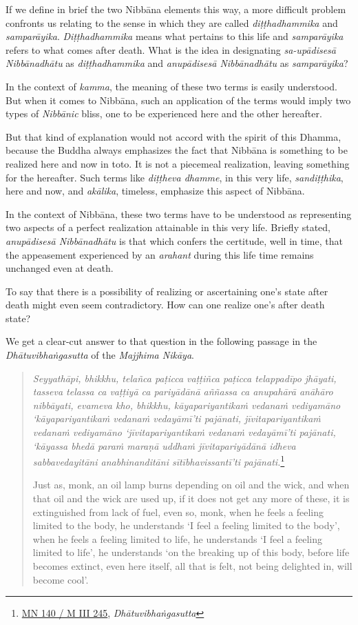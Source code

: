 If we define in brief the two Nibbāna elements this way, a more difficult problem confronts us relating to the sense in which they are called \emph{diṭṭhadhammika} and \emph{samparāyika}. \emph{Diṭṭhadhammika} means what pertains to this life and \emph{samparāyika} refers to what comes after death. What is the idea in designating \emph{sa-upādisesā Nibbānadhātu} as \emph{diṭṭhadhammika} and \emph{anupādisesā Nibbānadhātu} as \emph{samparāyika}?

In the context of \emph{kamma}, the meaning of these two terms is easily understood. But when it comes to Nibbāna, such an application of the terms would imply two types of \emph{Nibbānic} bliss, one to be experienced here and the other hereafter.

But that kind of explanation would not accord with the spirit of this Dhamma, because the Buddha always emphasizes the fact that Nibbāna is something to be realized here and now in toto. It is not a piecemeal realization, leaving something for the hereafter. Such terms like \emph{diṭṭheva dhamme}, in this very life, \emph{sandiṭṭhika}, here and now, and \emph{akālika}, timeless, emphasize this aspect of Nibbāna.

In the context of Nibbāna, these two terms have to be understood as representing two aspects of a perfect realization attainable in this very life. Briefly stated, \emph{anupādisesā Nibbānadhātu} is that which confers the certitude, well in time, that the appeasement experienced by an \emph{arahant} during this life time remains unchanged even at death.

To say that there is a possibility of realizing or ascertaining one's state after death might even seem contradictory. How can one realize one's after death state?

We get a clear-cut answer to that question in the following passage in the \emph{Dhātuvibhaṅgasutta} of the \emph{Majjhima Nikāya}.

\begin{quote}
\emph{Seyyathāpi, bhikkhu, telañca paṭicca vaṭṭiñca paṭicca telappadīpo jhāyati, tasseva telassa ca vaṭṭiyā ca pariyādānā aññassa ca anupahārā anāhāro nibbāyati, evameva kho, bhikkhu, kāyapariyantikaṁ vedanaṁ vediyamāno `kāyapariyantikaṁ vedanaṁ vedayāmī'ti pajānati, jīvitapariyantikaṁ vedanaṁ vediyamāno `jīvitapariyantikaṁ vedanaṁ vedayāmī'ti pajānati, `kāyassa bhedā paraṁ maraṇā uddhaṁ jīvitapariyādānā idheva sabbavedayitāni anabhinanditāni sītībhavissantī'ti pajānati.}\footnote{\href{https://suttacentral.net/mn140/pli/ms}{MN 140 / M III 245}, \emph{Dhātuvibhaṅgasutta}}

Just as, monk, an oil lamp burns depending on oil and the wick, and when that oil and the wick are used up, if it does not get any more of these, it is extinguished from lack of fuel, even so, monk, when he feels a feeling limited to the body, he understands `I feel a feeling limited to the body', when he feels a feeling limited to life, he understands `I feel a feeling limited to life', he understands `on the breaking up of this body, before life becomes extinct, even here itself, all that is felt, not being delighted in, will become cool'.
\end{quote}

